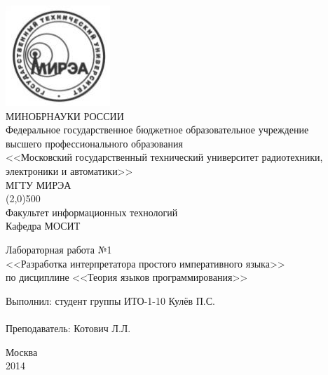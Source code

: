 \documentclass[a4paper,12pt]{article}
\begin{document}
\begin{titlepage}
\begin{center}
  \includegraphics[scale=0.5]{label.jpg}\\
  \vspace{20pt}
  МИНОБРНАУКИ РОССИИ\\
      Федеральное государственное бюджетное образовательное учреждение\\
      высшего профессионального образования\\
    <<Московский государственный технический университет радиотехники,\\
    электроники и автоматики>>\\ 
    {\large МГТУ МИРЭА}\\
    \line(2,0){500}\\
    \vspace{10pt}
    {\large Факультет информационных технологий\\}
    \vspace{10pt}
    {\large Кафедра МОСИТ}
\end{center}

\vspace{60pt}
\begin{center}
  Лабораторная работа №1\\
  \vspace{10pt}
  <<Разработка интерпретатора простого императивного языка>>\\
  \vspace{10pt}
  по дисциплине <<Теория языков программирования>>
\end{center}
\vspace{\fill}
Выполнил: \hfill студент группы ИТО-1-10 Кулёв П.С.\\
\\
Преподаватель: \hfill Котович Л.Л.
\begin{center}
\vspace{\fill}
Москва\\2014
\end{center}
\end{titlepage}

\newpage
\end{document}
